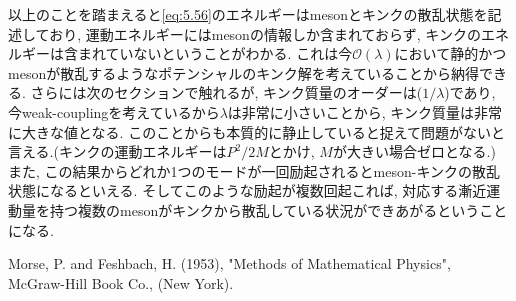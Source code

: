 \documentclass[dvipdfmx,11pt,a4paper,oneside,openany]{jsbook}
\begin{document}
以上のことを踏まえると\eqref{eq:5.56}のエネルギーはmesonとキンクの散乱状態を記述しており, 運動エネルギーにはmesonの情報しか含まれておらず, キンクのエネルギーは含まれていないということがわかる. これは今$\mathcal{O}(\lambda)$において静的かつmesonが散乱するようなポテンシャルのキンク解を考えていることから納得できる. さらには次のセクションで触れるが, キンク質量のオーダーは($1/\lambda$)であり, 今weak-couplingを考えているから$\lambda$は非常に小さいことから, キンク質量は非常に大きな値となる. このことからも本質的に静止していると捉えて問題がないと言える.(キンクの運動エネルギーは$P^2/2M$とかけ, $M$が大きい場合ゼロとなる.) また, この結果からどれか1つのモードが一回励起されるとmeson-キンクの散乱状態になるといえる. そしてこのような励起が複数回起これば, 対応する漸近運動量を持つ複数のmesonがキンクから散乱している状況ができあがるということになる.



\begin{thebibliography}{99}
    \bibitem[morse] Morse, P. and Feshbach, H. (1953), "Methods of Mathematical Physics", McGraw-Hill Book Co., (New York).
\end{thebibliography}
\end{document}
